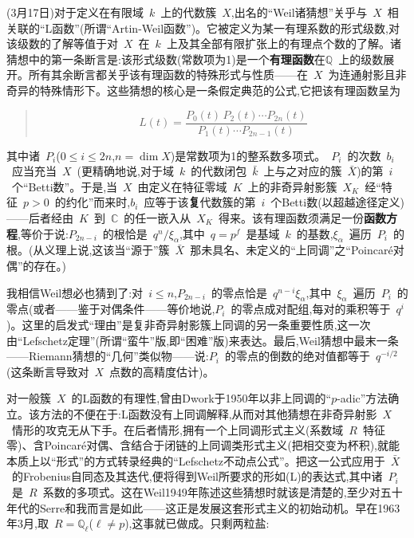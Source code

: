 \dmark{}(3月17日)对于定义在有限域~$k$~上的代数簇~$X$,出名的“Weil诸猜想”关乎与~$X$~相关联的“L函数”(所谓“Artin-Weil函数”)。它被定义为某一有理系数的形式级数,对该级数的了解等值于对~$X$~在~$k$~上及其全部有限扩张上的有理点个数的了解。诸猜想中的第一条断言是:该形式级数(常数项为1)是一个\textbf{有理函数}在$\mathbb{Q}$~上的级数展开。所有其余断言都关乎该有理函数的特殊形式与性质——在~$X$~为连通射影且非奇异的特殊情形下。这些猜想的核心是一条假定典范的公式,它把该有理函数呈为
\begin{quote}
$$L(t)=\frac{P_0(t)\,P_2(t)\cdots P_{2n}(t)}{P_1(t)\cdots P_{2n-1}(t)}$$
\end{quote}
其中诸~$P_i$($0\le i\le 2n$,$n=\dim X$)是常数项为1的整系数多项式。~$P_i$~的次数~$b_i$~应当充当~$X$~(更精确地说,对于域~$k$~的代数闭包~$\bar{k}$~上与之对应的簇~$\bar{X}$)的第~$i$~个“Betti数”。于是,当~$X$~由定义在特征零域~$K$~上的非奇异射影簇~$X_K$~经“特征~$p>0$~的约化”而来时,$b_i$~应等于该\textbf{复}代数簇的第~$i$~个Betti数(以超越途径定义)——后者经由~$K$~到~$\mathbb{C}$~的任一嵌入从~$X_K$~得来。该有理函数须满足一份\textbf{函数方程},等价于说:$P_{2n-i}$~的根恰是~$q^{n}/\xi_\alpha$,其中~$q=p^f$~是基域~$k$~的基数,$\xi_\alpha$~遍历~$P_i$~的根。(从义理上说,这该当“源于”簇~$\bar{X}$~那未具名、未定义的“上同调”之“Poincaré对偶”的存在。)

我相信Weil想必也猜到了:对~$i\le n$,$P_{2n-i}$~的零点恰是~$q^{n-i}\xi_\alpha$,其中~$\xi_\alpha$~遍历~$P_i$~的零点(或者——鉴于对偶条件——等价地说,$P_i$~的零点成对配组,每对的乘积等于~$q^i$)。这里的启发式“理由”是复非奇异射影簇\dmark{}上同调的另一条重要性质,这一次由“Lefschetz定理”(所谓“蛮牛”版,即“困难”版)来表达。最后,Weil猜想中最末一条——Riemann猜想的“几何”类似物——说:$P_i$~的零点的倒数的绝对值都等于~$q^{-i/2}$(这条断言导致对~$X$~点数的高精度估计)。

对一般簇~$X$~的L函数的有理性,曾由Dwork于1950年以非上同调的“$p$-adic”方法确立。该方法的不便在于:L函数没有上同调解释,从而对其他猜想在非奇异射影~$X$~情形的攻克无从下手。在后者情形,拥有一个上同调形式主义(系数域~$R$~特征零)、含Poincaré对偶、含结合于闭链的上同调类形式主义(把相交变为杯积),就能本质上以“形式”的方式转录经典的“Lefschetz不动点公式”。把这一公式应用于~$\bar{X}$~的Frobenius自同态及其迭代,便将得到Weil所要求的形如(L)的表达式,其中诸~$P_i$~是~$R$~系数的多项式。这在Weil1949年陈述这些猜想时就该是清楚的,至少对五十年代的Serre和我而言是如此——这正是发展这套形式主义的初始动机。早在1963年3月,取~$R=\mathbb{Q}_\ell$($\ell\ne p$),这事就已做成。只剩两粒盐:

